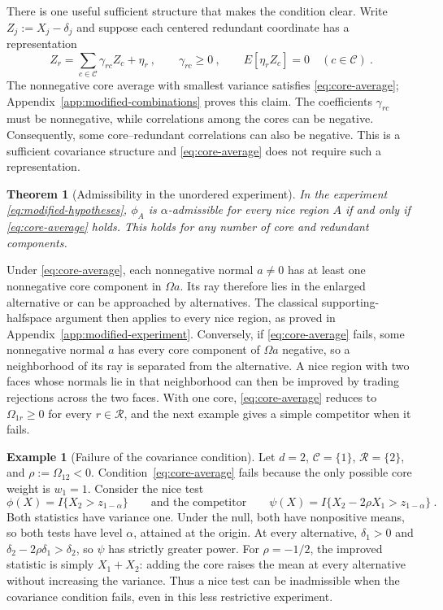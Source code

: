 \documentclass[11pt]{article}
\newcommand{\red}[1]{{\color{red}#1}} %
\numberwithin{equation}{section}
\newtheorem{theorem}{Theorem}
\theoremstyle{definition}
\newtheorem{example}{Example}
\begin{document}
There is one useful sufficient structure that makes the condition clear. Write $Z_j:=X_j-\delta_j$ and suppose each centered redundant coordinate has a representation
\[
Z_r=\sum_{c\in\mathcal C}\gamma_{rc}Z_c+\eta_r~,
\qquad\gamma_{rc}\ge0~,
\qquad E[\eta_rZ_c]=0\quad(c\in\mathcal C)~.
\]
The nonnegative core average with smallest variance satisfies \eqref{eq:core-average}; Appendix~\ref{app:modified-combinations} proves this claim. The coefficients $\gamma_{rc}$ must be nonnegative, while correlations among the cores can be negative. Consequently, some core--redundant correlations can also be negative. This is a sufficient covariance structure and \eqref{eq:core-average} does not require such a representation.

\red{%
\begin{theorem}[Admissibility in the unordered experiment]\label{thm:modified-nice}
In the experiment \eqref{eq:modified-hypotheses}, $\phi_A$ is $\alpha$-admissible for every nice region $A$ if and only if \eqref{eq:core-average} holds. This holds for any number of core and redundant components.
\end{theorem}
}

Under \eqref{eq:core-average}, each nonnegative normal $a\ne0$ has at least one nonnegative core component in $\Omega a$. Its ray therefore lies in the enlarged alternative or can be approached by alternatives. The classical supporting-halfspace argument then applies to every nice region, as proved in Appendix~\ref{app:modified-experiment}. \red{Conversely, if \eqref{eq:core-average} fails, some nonnegative normal $a$ has every core component of $\Omega a$ negative, so a neighborhood of its ray is separated from the alternative. A nice region with two faces whose normals lie in that neighborhood can then be improved by trading rejections across the two faces. With one core, \eqref{eq:core-average} reduces to $\Omega_{1r}\ge0$ for every $r\in\mathcal R$, and the next example gives a simple competitor when it fails.}

\begin{example}[Failure of the covariance condition]\label{ex:negative-correlation}
Let $d=2$, $\mathcal C=\{1\}$, $\mathcal R=\{2\}$, and $\rho:=\Omega_{12}<0$. Condition~\eqref{eq:core-average} fails because the only possible core weight is $w_1=1$. Consider the nice test
\[
\phi(X)=I\{X_2>z_{1-\alpha}\}
\qquad\text{and the competitor}\qquad
\psi(X)=I\{X_2-2\rho X_1>z_{1-\alpha}\}~.
\]
Both statistics have variance one. Under the null, both have nonpositive means, so both tests have level $\alpha$, attained at the origin. At every alternative, $\delta_1>0$ and $\delta_2-2\rho\delta_1>\delta_2$, so $\psi$ has strictly greater power. For $\rho=-1/2$, the improved statistic is simply $X_1+X_2$: adding the core raises the mean at every alternative without increasing the variance. Thus a nice test can be inadmissible when the covariance condition fails, even in this less restrictive experiment.
\end{example}
\end{document}

